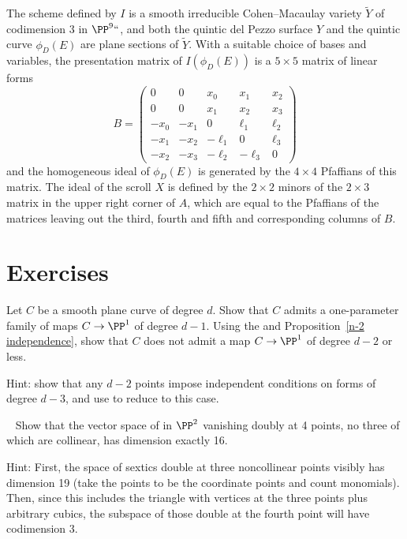\begin{fact}
\begin{proposition} \label{5x5 Pfaffians}
The scheme defined by 
$I$ is a smooth irreducible Cohen--Macaulay variety $\tilde Y$ of codimension 
$3$ in $\PP^9` `$,
and both the quintic del Pezzo surface $Y$ and the quintic curve $\phi_D(E)$ are plane sections of $\tilde Y$.
With a suitable choice of bases and variables,  the presentation
matrix of $I(\phi_D(E))$ is 
a $5\times 5$ matrix of linear forms 
$$
B =\begin{pmatrix}
0&0&x_0&x_1&x_2\\
0&0&x_1&x_2&x_3\\
-x_0&-x_1&0&\ell_1&\ell_2\\
-x_1&-x_2&-\ell_1&0&\ell_3\\
-x_2&-x_3&-\ell_2&-\ell_3&0
\end{pmatrix}
$$
and
the homogeneous ideal of $\phi_D(E)$ is generated by the  $4\times 4$ Pfaffians of this matrix. The ideal of 
the scroll $X$ is defined by the $2\times 2$ minors of the $2\times 3$ matrix in the upper right corner of $A$, which
are equal to the Pfaffians of the matrices leaving out the 
third, fourth and fifth 
and corresponding columns of $B$.
\vspace*{-1.4\baselineskip}
\end{proposition}
\end{fact}

\section{Exercises}

\begin{exercise}\label{gonality of smooth plane curve}
Let $C$ be a smooth plane curve of degree $d$. Show that $C$ admits a
one-parameter family of maps $C \to \PP^1$ of degree $d-1$. Using the
%
and Proposition~\ref{n-2 independence}, show
that $C$ does not admit a map $C \to \PP^1$ of degree $d-2$ or less.  

Hint: show that any $d-2$ points impose independent conditions on
forms of degree $d-3$, and use 
%
to reduce to this case.
\end{exercise}

\begin{exercise}~\label{double vanishing at 4 points}
Show that the vector space of 
%
in $\PP^2$ vanishing doubly at 4 points, no three of which are
collinear,  has dimension
exactly 16.

Hint: First, the space of sextics double at three noncollinear points visibly has dimension 19 (take the points to be the coordinate points and count monomials). Then, since this includes the triangle with vertices at the three points plus arbitrary cubics, the subspace of those double at the fourth point will have codimension 3.
\end{exercise}


